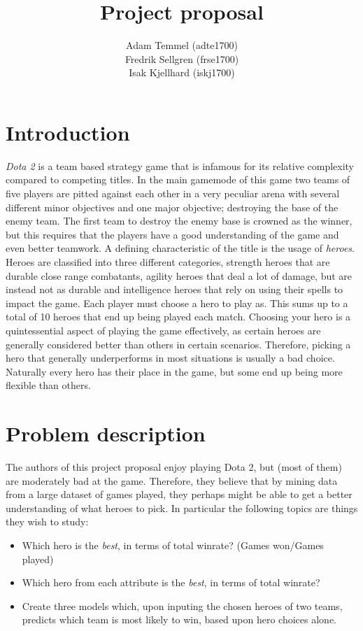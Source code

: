 \documentclass[a4paper, titlepage,12pt]{article}
\title{Project proposal}
\author{Adam Temmel (adte1700)\\ Fredrik Sellgren (frse1700)\\Isak Kjellhard (iskj1700)}
\begin{document}
	\maketitle
	\section{Introduction}\label{sec:introduction}
		\textit{Dota 2} is a team based strategy game that is infamous for its relative complexity compared to competing titles. In the main gamemode of this game two teams of five players are pitted against each other in a very peculiar arena with several different minor objectives and one major objective; destroying the base of the enemy team. The first team to destroy the enemy base is crowned as the winner, but this requires that the players have a good understanding of the game and even better teamwork. A defining characteristic of the title is the usage of \textit{heroes}. Heroes are classified into three different categories, strength heroes that are durable close range combatants, agility heroes that deal a lot of damage, but are instead not as durable and intelligence heroes that rely on using their spells to impact the game. Each player must choose a hero to play as. This sums up to a total of 10 heroes that end up being played each match. Choosing your hero is a quintessential aspect of playing the game effectively, as certain heroes are generally considered better than others in certain scenarios. Therefore, picking a hero that generally underperforms in most situations is usually a bad choice. Naturally every hero has their place in the game, but some end up being more flexible than others.
	\section{Problem description}\label{sec:problem}
		The authors of this project proposal enjoy playing Dota 2, but (most of them) are moderately bad at the game. Therefore, they believe that by mining data from a large dataset of games played, they perhaps might be able to get a better understanding of what heroes to pick. In particular the following topics are things they wish to study:
		\begin{itemize}
			\item Which hero is the \textit{best}, in terms of total winrate? (Games won/Games played)
			\item Which hero from each attribute is the \textit{best}, in terms of total winrate?
			\item Create three models which, upon inputing the chosen heroes of two teams, predicts which team is most likely to win, based upon hero choices alone.
		\end{itemize}
\end{document}
